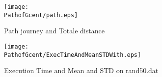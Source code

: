 \begin{figure}[H]
	\begin{minipage}[t]{0.45\linewidth}
	\centering
	\texttt{[image: \\PathofGcent/path.eps]}
	\caption{Path journey and Totale distance}\label{fig:PathofGcent:path}
	
	\end{minipage}\hfill
	\begin{minipage}[t]{0.45\linewidth}
	\centering
	\texttt{[image: \\PathofGcent/ExecTimeAndMeanSTDWith.eps]}
	\caption{Execution Time and Mean and STD on rand50.dat}
	\label{fig:PathofGcent:AS_1_5AS_ExecTimeAndMeanSTDWith_execVariation}
	\end{minipage}
\end{figure}